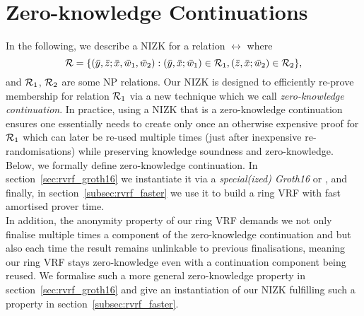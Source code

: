 \section{Zero-knowledge Continuations}
\label{sec:rvrf_cont}

\noindent In the following, we describe a NIZK for a relation $\rel$ where
$$\mathcal{R} = \{(\bar{y}, \bar{z}; \bar{x}, \bar{w}_1, \bar{w}_2):  (\bar{y}, \bar{x}; \bar{w}_1) \in \mathcal{R}_1, (\bar{z}, \bar{x}; \bar{w}_2) \in \mathcal{R}_2 \},$$
and $\mathcal{R}_1$, $\mathcal{R}_2$ are some NP relations. Our NIZK is designed to efficiently re-prove membership for relation $\mathcal{R}_1$
via a new technique which we call \emph{zero-knowledge continuation}. In practice, using a NIZK that is a zero-knowledge continuation 
ensures one essentially needs to create only once an otherwise expensive proof for $\mathcal{R}_1$ which can later be 
re-used multiple times (just after inexpensive re-randomisations) while preserving knowledge soundness and zero-knowledge. 
Below, we formally define zero-knowledge continuation. In section~\ref{sec:rvrf_groth16} we instantiate it via a \emph{special(ized) 
Groth16} or \SpecialG, and finally, in section~\ref{subsec:rvrf_faster} we use it to build a ring VRF with fast amortised prover time. \\

\noindent In addition, the anonymity property of our ring VRF demands we not only finalise multiple times a component of the zero-knowledge 
continuation and but also each time the result remains unlinkable to previous finalisations, meaning our ring VRF stays zero-knowledge 
even with a continuation component being reused. We formalise such a more general zero-knowledge property in 
section~\ref{sec:rvrf_groth16} and give an instantiation of our NIZK fulfilling such a property in section~\ref{subsec:rvrf_faster}. 


